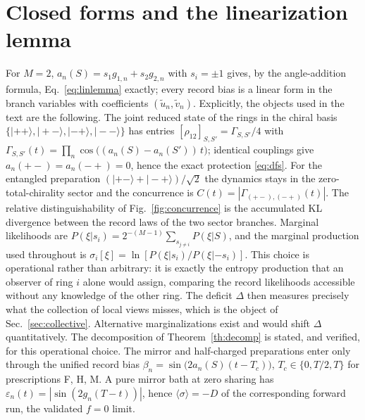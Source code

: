 \documentclass[11pt]{article}
\begin{document}
\section{Closed forms and the linearization lemma}
For $M{=}2$, $a_n(S)=s_1g_{1,n}+s_2g_{2,n}$ with $s_i=\pm1$ gives, by the angle-addition formula, Eq.~\eqref{eq:linlemma} exactly; every record bias is a linear form in the branch variables with coefficients $(\tilde u_n,\tilde v_n)$. Explicitly, the objects used in the text are the following. The joint reduced state of the rings in the chiral basis $\{|{+}{+}\rangle,|{+}{-}\rangle,|{-}{+}\rangle,|{-}{-}\rangle\}$ has entries $[\rho_{12}]_{S,S'}=\Gamma_{S,S'}/4$ with $\Gamma_{S,S'}(t)=\prod_n\cos\!\big((a_n(S)-a_n(S'))\,t\big)$; identical couplings give $a_n({+}{-})=a_n({-}{+})=0$, hence the exact protection \eqref{eq:dfs}. For the entangled preparation $(|{+}{-}\rangle+|{-}{+}\rangle)/\sqrt2$ the dynamics stays in the zero-total-chirality sector and the concurrence \cite{Wootters} is $C(t)=|\Gamma_{({+}{-}),({-}{+})}(t)|$. The relative distinguishability of Fig.~\ref{fig:concurrence} is the accumulated KL divergence between the record laws of the two sector branches. Marginal likelihoods are $P(\xi|s_i)=2^{-(M-1)}\sum_{s_{j\ne i}}P(\xi|S)$, and the marginal production used throughout is $\sigma_i[\xi]=\ln[P(\xi|s_i)/P(\xi|{-}s_i)]$. This choice is operational rather than arbitrary: it is exactly the entropy production that an observer of ring $i$ alone would assign, comparing the record likelihoods accessible without any knowledge of the other ring. The deficit $\Delta$ then measures precisely what the collection of local views misses, which is the object of Sec.~\ref{sec:collective}. Alternative marginalizations exist and would shift $\Delta$ quantitatively. The decomposition of Theorem~\ref{th:decomp} is stated, and verified, for this operational choice. The mirror and half-charged preparations enter only through the unified record bias $\beta_n=\sin\!\big(2a_n(S)(t-T_c)\big)$, $T_c\in\{0,T/2,T\}$ for prescriptions F, H, M. A pure mirror bath at zero sharing has $\varepsilon_n(t)=|\sin(2g_n(T-t))|$, hence $\langle\sigma\rangle=-D$ of the corresponding forward run, the validated $f{=}0$ limit.
\end{document}
